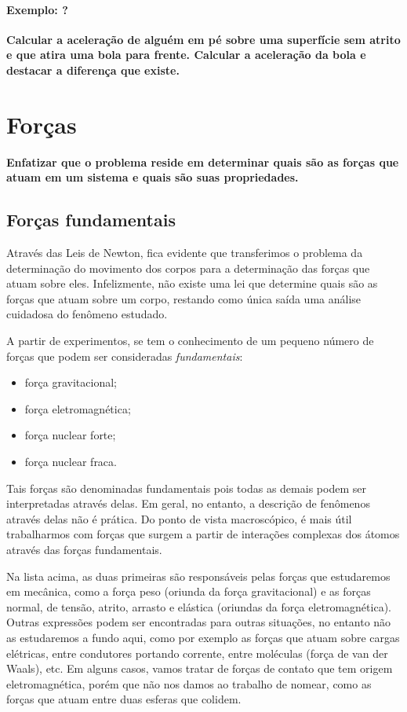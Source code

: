 \paragraph{Exemplo: ?}

\textbf{Calcular a aceleração de alguém em pé sobre uma superfície sem atrito e que atira uma bola para frente. Calcular a aceleração da bola e destacar a diferença que existe.}

\section{Forças}

\textbf{Enfatizar que o problema reside em determinar quais são as forças que atuam em um sistema e quais são suas propriedades.}

\subsection{Forças fundamentais}

Através das Leis de Newton, fica evidente que transferimos o problema da determinação do movimento dos corpos para a determinação das forças que atuam sobre eles. Infelizmente, não existe uma lei que determine quais são as forças que atuam sobre um corpo, restando como única saída uma análise cuidadosa do fenômeno estudado.

A partir de experimentos, se tem o conhecimento de um pequeno número de forças que podem ser consideradas \emph{fundamentais}:
\begin{itemize}
  \item força gravitacional;
  \item força eletromagnética;
  \item força nuclear forte;
  \item força nuclear fraca.
\end{itemize}
%
Tais forças são denominadas fundamentais pois todas as demais podem ser interpretadas através delas. Em geral, no entanto, a descrição de fenômenos através delas não é prática. Do ponto de vista macroscópico, é mais útil trabalharmos com forças que surgem a partir de interações complexas dos átomos através das forças fundamentais.

Na lista acima, as duas primeiras são responsáveis pelas forças que estudaremos em mecânica, como a força peso (oriunda da força gravitacional) e as forças normal, de tensão, atrito, arrasto e elástica (oriundas da força eletromagnética). Outras expressões podem ser encontradas para outras situações, no entanto não as estudaremos a fundo aqui, como por exemplo as forças que atuam sobre cargas elétricas, entre condutores portando corrente, entre moléculas (força de van der Waals), etc. Em alguns casos, vamos tratar de forças de contato que tem origem eletromagnética, porém que não nos damos ao trabalho de nomear, como as forças que atuam entre duas esferas que colidem.

